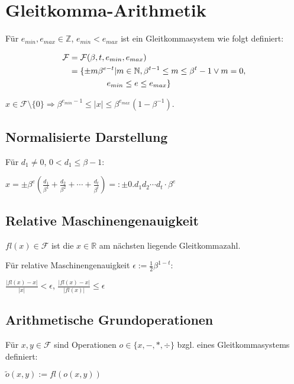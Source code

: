 \section*{Gleitkomma-Arithmetik}

Für $e_{min}, e_{max} \in \mathbb{Z}$, $e_{min} < e_{max}$ ist ein Gleitkommasystem wie folgt definiert:

\vspace*{-4mm}
\begin{align*}
	\mathcal{F} &= \mathcal{F}(\beta,t,e_{min},e_{max}) \\
	            &= \{ \pm m \beta^{e-t} | m \in \mathbb{N}, \beta^{t-1} \leq m \leq \beta^t - 1 \lor m = 0, \\ & \hspace*{16mm}e_{min} \leq e \leq e_{max} \}
\end{align*}

$x \in \mathcal{F} \setminus \{0\} \Rightarrow \beta^{e_{min}-1} \leq |x| \leq \beta^{e_{max}}(1-\beta^{-1})$.

\subsection*{Normalisierte Darstellung}

Für $d_1 \neq 0$, $0 < d_1 \leq \beta - 1$:

$x=\pm \beta^e ( \frac{d_1}{\beta^1} + \frac{d_2}{\beta^2} + \cdots + \frac{d_t}{\beta^t} ) =: \pm 0.d_1 d_2 \cdots d_t \cdot \beta^e$

\subsection*{Relative Maschinengenauigkeit}

$fl(x) \in \mathcal{F}$ ist die $x \in \mathbb{R}$ am nächsten liegende Gleitkommazahl.

Für relative Maschinengenauigkeit $\epsilon := \frac{1}{2} \beta^{1-t}$:

$\frac{|fl(x)-x|}{|x|} < \epsilon$, $\frac{|fl(x)-x|}{|fl(x)|} \leq \epsilon$

\subsection*{Arithmetische Grundoperationen}

Für $x, y \in \mathcal{F}$ sind Operationen $o \in \{x,-,*,\div\}$ bzgl. eines Gleitkommasystems definiert:

$\tilde o(x,y) := fl(o(x,y))$

